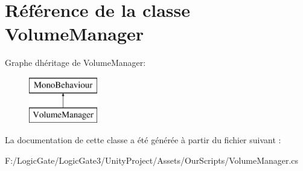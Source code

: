 \hypertarget{class_volume_manager}{}\section{Référence de la classe Volume\+Manager}
\label{class_volume_manager}
Graphe d\textquotesingle{}héritage de Volume\+Manager\+:\begin{figure}[H]
\begin{center}
\leavevmode
\includegraphics[height=2.000000cm]{class_volume_manager}
\end{center}
\end{figure}


La documentation de cette classe a été générée à partir du fichier suivant \+:\begin{DoxyCompactItemize}
\item 
F\+:/\+Logic\+Gate/\+Logic\+Gate3/\+Unity\+Project/\+Assets/\+Our\+Scripts/Volume\+Manager.\+cs\end{DoxyCompactItemize}

